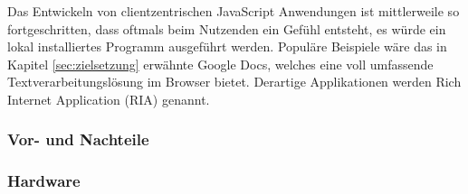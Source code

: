  
 Das Entwickeln von clientzentrischen JavaScript Anwendungen ist mittlerweile so fortgeschritten, dass oftmals beim Nutzenden ein Gefühl entsteht, es würde ein lokal installiertes Programm ausgeführt werden. Populäre Beispiele wäre das in Kapitel \ref{sec:zielsetzung} erwähnte Google Docs, welches eine voll umfassende Textverarbeitungslösung im Browser bietet. Derartige Applikationen werden Rich Internet Application (RIA) genannt.
 

\subsubsection{Vor- und Nachteile}\label{sec:vorundnachteileweb}

\subsubsection{Hardware}\label{sec:hardware}